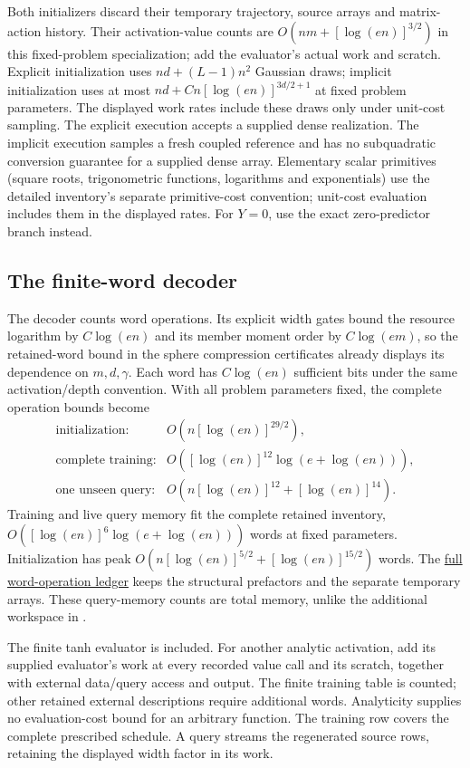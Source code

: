 Both initializers discard their temporary trajectory, source arrays and
matrix-action history. Their activation-value counts are
$O(nm+[\log(en)]^{3/2})$ in this fixed-problem specialization; add the
evaluator's actual work and scratch. Explicit initialization uses
$nd+(L-1)n^2$ Gaussian draws;
implicit initialization uses at most $nd+Cn[\log(en)]^{3d/2+1}$ at fixed
problem parameters. The displayed work rates include these draws only
under unit-cost sampling. The explicit execution accepts a supplied dense
realization. The implicit execution samples a fresh coupled reference and
has no subquadratic conversion guarantee for a supplied dense array.
Elementary scalar primitives (square roots, trigonometric functions,
logarithms and exponentials) use the detailed inventory's separate
primitive-cost convention; unit-cost evaluation includes them in the
displayed rates. For $Y=0$, use the exact zero-predictor branch instead.

\subsection{The finite-word decoder}

The decoder counts word operations. Its explicit width gates bound the
resource logarithm by $C\log(en)$ and its member moment order by
$C\log(em)$, so the retained-word bound in the sphere compression certificates
already displays its dependence on $m,d,\gamma$. Each word has $C\log(en)$
sufficient bits under the same activation/depth convention. With all
problem parameters fixed, the complete operation bounds become
\begin{equation}
\begin{array}{rl}
\text{initialization:}&O(n[\log(en)]^{29/2}),\\
\text{complete training:}&O([\log(en)]^{12}\log(e+\log(en))),\\
\text{one unseen query:}&O(n[\log(en)]^{12}+[\log(en)]^{14}).
\end{array}
\label{eq:decoder-work}
\end{equation}
Training and live query memory fit the complete retained inventory,
$O([\log(en)]^6\log(e+\log(en)))$ words at fixed parameters. Initialization
has peak $O(n[\log(en)]^{5/2}+[\log(en)]^{15/2})$ words. The
\hyperref[int:decoder-finite-backends]{full word-operation ledger} keeps the structural
prefactors and the separate temporary arrays. These query-memory counts
are total memory, unlike the additional workspace in .

The finite tanh evaluator is included. For another analytic activation,
add its supplied evaluator's work at every recorded value call and its
scratch, together with external data/query access and output. The finite
training table is counted; other retained external descriptions require
additional words. Analyticity supplies no evaluation-cost bound for an
arbitrary function. The training row covers the complete prescribed
schedule. A query streams the regenerated source rows, retaining the
displayed width factor in its work.
